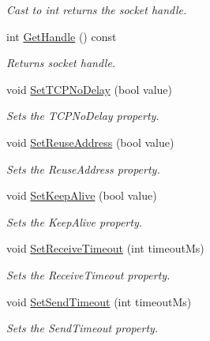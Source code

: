\begin{DoxyCompactItemize}
\begin{DoxyCompactList}\small\item\em Cast to int returns the socket handle. \end{DoxyCompactList}\item 
\hypertarget{class_common_1_1_socket_a0091cdecdcea509fff867a1248711d1e}{int \hyperlink{class_common_1_1_socket_a0091cdecdcea509fff867a1248711d1e}{Get\-Handle} () const }\label{class_common_1_1_socket_a0091cdecdcea509fff867a1248711d1e}

\begin{DoxyCompactList}\small\item\em Returns socket handle. \end{DoxyCompactList}\item 
void \hyperlink{class_common_1_1_socket_ace7e4a33a73bb9d8184b09d996cd9092}{Set\-T\-C\-P\-No\-Delay} (bool value)
\begin{DoxyCompactList}\small\item\em Sets the T\-C\-P\-No\-Delay property. \end{DoxyCompactList}\item 
void \hyperlink{class_common_1_1_socket_a12b6a9811f0034a05b85fe71a28b23d2}{Set\-Reuse\-Address} (bool value)
\begin{DoxyCompactList}\small\item\em Sets the Reuse\-Address property. \end{DoxyCompactList}\item 
void \hyperlink{class_common_1_1_socket_acc89388307afa13ccd95dfb7525bc037}{Set\-Keep\-Alive} (bool value)
\begin{DoxyCompactList}\small\item\em Sets the Keep\-Alive property. \end{DoxyCompactList}\item 
void \hyperlink{class_common_1_1_socket_a1b35c435dd74e7f8b22bcf2209a94a07}{Set\-Receive\-Timeout} (int timeout\-Ms)
\begin{DoxyCompactList}\small\item\em Sets the Receive\-Timeout property. \end{DoxyCompactList}\item 
void \hyperlink{class_common_1_1_socket_aca62c173305779aa5286f01ee0472ce0}{Set\-Send\-Timeout} (int timeout\-Ms)
\begin{DoxyCompactList}\small\item\em Sets the Send\-Timeout property. \end{DoxyCompactList}\item 

\end{DoxyCompactItemize}
